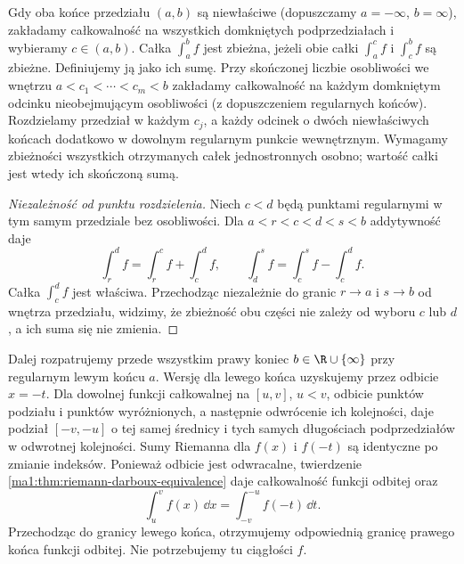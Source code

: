 \begin{definicja}
\label{ma1:def:improper-splitting}
Gdy oba końce przedziału $(a,b)$ są niewłaściwe (dopuszczamy $a=-\infty$, $b=\infty$), zakładamy całkowalność na wszystkich domkniętych podprzedziałach i wybieramy $c\in(a,b)$. Całka $\int_a^b f$ jest zbieżna, jeżeli obie całki $\int_a^c f$ i $\int_c^b f$ są zbieżne. Definiujemy ją jako ich sumę. Przy skończonej liczbie osobliwości we wnętrzu $a<c_1<\cdots<c_m<b$ zakładamy całkowalność na każdym domkniętym odcinku nieobejmującym osobliwości (z dopuszczeniem regularnych końców). Rozdzielamy przedział w każdym $c_j$, a każdy odcinek o dwóch niewłaściwych końcach dodatkowo w dowolnym regularnym punkcie wewnętrznym. Wymagamy zbieżności wszystkich otrzymanych całek jednostronnych osobno; wartość całki jest wtedy ich skończoną sumą.
\end{definicja}
\begin{proof}[Niezależność od punktu rozdzielenia]
Niech $c<d$ będą punktami regularnymi w tym samym przedziale bez osobliwości. Dla $a<r<c<d<s<b$ addytywność daje
\[
 \int_r^d f=\int_r^c f+\int_c^d f,\qquad
 \int_d^s f=\int_c^s f-\int_c^d f.
\]
Całka $\int_c^d f$ jest właściwa. Przechodząc niezależnie do granic $r\to a$ i $s\to b$ od wnętrza przedziału, widzimy, że zbieżność obu części nie zależy od wyboru $c$ lub $d$, a ich suma się nie zmienia.
\end{proof}
Dalej rozpatrujemy przede wszystkim prawy koniec $b\in\R\cup\{\infty\}$ przy regularnym lewym końcu $a$. Wersję dla lewego końca uzyskujemy przez odbicie $x=-t$. Dla dowolnej funkcji całkowalnej na $[u,v]$, $u<v$, odbicie punktów podziału i punktów wyróżnionych, a następnie odwrócenie ich kolejności, daje podział $[-v,-u]$ o tej samej średnicy i tych samych długościach podprzedziałów w odwrotnej kolejności. Sumy Riemanna dla $f(x)$ i $f(-t)$ są identyczne po zmianie indeksów. Ponieważ odbicie jest odwracalne, twierdzenie \ref{ma1:thm:riemann-darboux-equivalence} daje całkowalność funkcji odbitej oraz
\[
 \int_u^v f(x)\,\dd x=\int_{-v}^{-u}f(-t)\,\dd t.
\]
Przechodząc do granicy lewego końca, otrzymujemy odpowiednią granicę prawego końca funkcji odbitej. Nie potrzebujemy tu ciągłości $f$.

